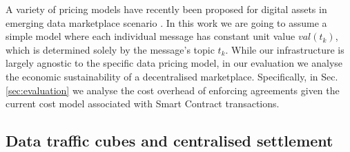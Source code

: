\documentclass[chi_draft]{sigchi}
\begin{document}
%	
%




A variety of pricing models have recently been proposed for digital assets in emerging data marketplace scenario \cite{Sen:2015:SDP:2847579.2756543,Li:2014:TPP:2691190.2691191,7553037,7437020}.
In this work we are going to assume a simple model where each individual message has constant unit value $\mathit{val}(t_k)$, which is determined solely by the message's topic $t_k$. 
While our infrastructure is largely agnostic to the specific data pricing model, in our evaluation we analyse the economic sustainability of a decentralised marketplace. Specifically, in Sec.\ref{sec:evaluation} we analyse the cost overhead of enforcing agreements given the current cost model associated with Smart Contract transactions.

\subsection{Data traffic cubes and centralised settlement}
\end{document}
